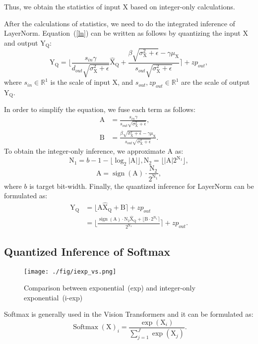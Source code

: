 \documentclass{article}
\begin{document}
Thus, we obtain the statistics of input $\textrm{X}$ based on integer-only calculations.


After the calculations of statistics, we need to do the integrated inference of LayerNorm.
Equation~(\ref{ln}) can be written as follows by quantizing the input $\textrm{X}$ and output $\textrm{Y}_\textrm{Q}$:
\begin{equation}
\textrm{Y}_\textrm{Q}=\lfloor\frac{ s_{in}\gamma}{d_{out}\sqrt{\sigma_\textrm{X}^2+\epsilon}}\widehat{\textrm{X}}_\textrm{Q} +\frac{\beta\sqrt{\sigma_\textrm{X}^2+\epsilon}-\gamma\mu_\textrm{X}}{s_{out}\sqrt{\sigma_\textrm{X}^2+\epsilon}}\rceil+{zp}_{out},
\end{equation}
where $s_{in}\in \mathds{R}^1$ is the scale of input $\textrm{X}$, and $s_{out},{zp}_{out}\in \mathds{R}^1$ are the scale of output $\textrm{Y}_\textrm{Q}$.

In order to simplify the equation, we fuse each term as follows:
\begin{align}
    \textrm{A}&=\frac{s_{in}\gamma}{s_{out}\sqrt{\sigma_\textrm{X}^2+\epsilon}},\\
    \textrm{B}&=\frac{\beta\sqrt{\sigma_\textrm{X}^2+\epsilon}-\gamma\mu_\textrm{X}}{s_{out}\sqrt{\sigma_\textrm{X}^2+\epsilon}}.
\end{align}
To obtain the integer-only inference, we approximate $\textrm{A}$ as:
\begin{equation}
    \textrm{N}_1= b - 1 - \lfloor \log_2|\textrm{A}|\rfloor, \textrm{N}_2=\lfloor |\textrm{A}|  2^{\textrm{N}_1}\rfloor,
\end{equation}
\begin{equation}
    \textrm{A}=\operatorname{sign}(\textrm{A}) \cdot \frac{\textrm{N}_2}{2^{\textrm{N}_1}},
\end{equation}
where $b$ is target bit-width.
Finally, the quantized inference for LayerNorm can be formulated as:
\begin{align}
    \textrm{Y}_\textrm{Q}&=\lfloor \textrm{A}\widehat{\textrm{X}}_\textrm{Q}+\textrm{B}\rceil+{zp}_{out}\\
    &=\lfloor \frac{\operatorname{sign}(\textrm{A}) \cdot\textrm{N}_2\widehat{\textrm{X}}_\textrm{Q} + \lfloor \textrm{B}\cdot 2^{\textrm{N}_1}\rceil }{2^{\textrm{N}_1}}\rceil +{zp}_{out}.
\end{align}


\subsection{Quantized Inference of Softmax}
\begin{figure}[t]
    \centering
    \texttt{[image: ./fig/iexp\_vs.png]}
    \caption{Comparison between exponential~(exp) and integer-only exponential~(i-exp)}
    \label{iexp_vs}
\end{figure}
Softmax is generally used in the Vision Transformers and it can be formulated as:
\begin{equation}
    \operatorname{Softmax}(\textrm{X})_i = \frac{\exp(\textrm{X}_i)}{\sum_{j=1}^{J}\exp(\textrm{X}_j)}.
\end{equation}
\end{document}
